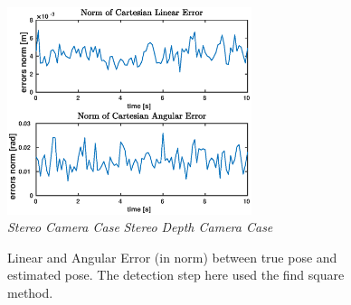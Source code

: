 \begin{figure}
	\includegraphics[width=7.15cm]{tracking/square-depth.eps}\\
	\hspace*{20px}\textit{Stereo Camera Case} \hspace{75px} \textit{Stereo Depth Camera Case}\\
	\vspace{30px}
	\caption[Tracking error plots with find square detection initialization]{Linear and Angular Error (in norm) between true pose and estimated pose. The detection step here used the find square method.}
	\label{fig:squareErrors}
\end{figure}

